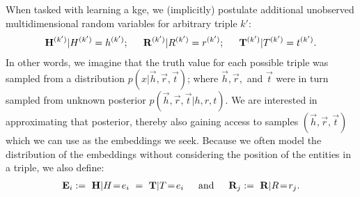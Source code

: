 When tasked with learning a \gls*{kge}, we (implicitly) postulate additional unobserved multidimensional random variables for arbitrary triple $k'$:
\begin{align}
\vec{H}^{(k')} | H^{(k')} = h^{(k')} ; 
\hspace{1.5em} 
\vec{R}^{(k')} | R^{(k')} = r^{(k')} ;
\hspace{1.5em} 
\vec{T}^{(k')} | T^{(k')} = t^{(k')} .
\end{align}
In other words, we imagine that the truth value for each possible triple was sampled from a distribution $p(x|\vec{h}, \vec{r}, \vec{t})$; where $\vec{h}, \vec{r},$ and $\vec{t}$ were in turn sampled from unknown posterior $p(\vec{h}, \vec{r}, \vec{t}|h,r,t)$. We are interested in approximating that posterior, thereby also gaining access to samples $(\vec{h}, \vec{r}, \vec{t})$ which we can use as the embeddings we seek.
%
%
%
Because we often model the distribution of the embeddings without considering the position of the entities in a triple, we also define:
\begin{align}
    \vec{E}_i :=\ \vec{H}|H\!=\!e_i\ =\ \vec{T}|T\!=\!e_i %
    \hspace{1.5em} \text{and} \hspace{1.5em}
    \vec{R}_j :=\ \vec{R}|R\!=\!r_j .
\end{align}


